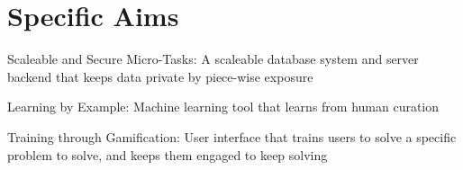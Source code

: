 \section{Specific Aims}
\begin{compactenum}
\item Scaleable and Secure Micro-Tasks: A scaleable database system and server backend that keeps data private by piece-wise exposure
\item Learning by Example: Machine learning tool that learns from human curation
\item Training through Gamification: User interface that trains users to solve a specific problem to solve, and keeps them engaged to keep solving
\end{compactenum}

